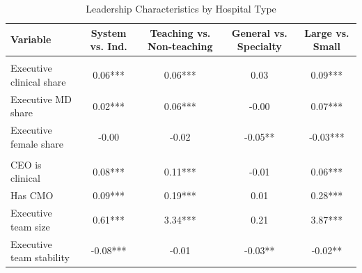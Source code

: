 \begin{table}[!h]
\centering
\caption{Leadership Characteristics by Hospital Type\label{tab:balance}}
\centering
\begin{tabular}[t]{lcccc}
\toprule
Variable & System vs. Ind. & Teaching vs. Non-teaching & General vs. Specialty & Large vs. Small\\
\midrule
\addlinespace[0.3em]
\multicolumn{5}{l}{\textbf{Executive Composition}}\\
\hspace{1em}Executive clinical share & 0.06*** & 0.06*** & 0.03 & 0.09***\\
\hspace{1em}Executive MD share & 0.02*** & 0.06*** & -0.00 & 0.07***\\
\hspace{1em}Executive female share & -0.00 & -0.02 & -0.05** & -0.03***\\
\addlinespace[0.3em]
\multicolumn{5}{l}{\textbf{Leadership Structure}}\\
\hspace{1em}CEO is clinical & 0.08*** & 0.11*** & -0.01 & 0.06***\\
\hspace{1em}Has CMO & 0.09*** & 0.19*** & 0.01 & 0.28***\\
\hspace{1em}Executive team size & 0.61*** & 3.34*** & 0.21 & 3.87***\\
\hspace{1em}Executive team stability & -0.08*** & -0.01 & -0.03** & -0.02**\\
\bottomrule
\end{tabular}
\end{table}
